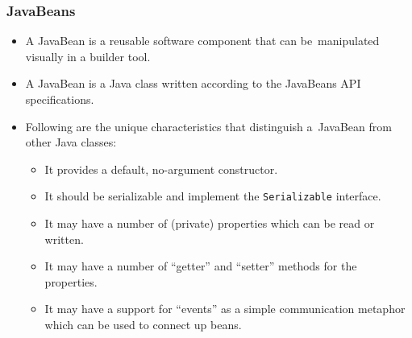 \documentclass[10pt,xcolor=pdflatex]{beamer}
\begin{document}

\begin{frame}[containsverbatim]\frametitle{JavaBeans}
	\begin{itemize}
        \item A JavaBean is a reusable software component that can be~manipulated visually
in a builder tool.
        \item A JavaBean is a Java class written according to the JavaBeans API specifications.
        \item Following are the unique characteristics that distinguish a~JavaBean from other Java classes:
            \begin{itemize}
              \item It provides a default, no-argument constructor.
              \item It should be serializable and implement the \texttt{Serializable} interface.
              \item It may have a number of (private) properties which can be read or written.
              \item It may have a number of ``getter'' and ``setter'' methods for the properties.
              \item It may have a support for ``events'' as a simple communication metaphor which can be used to connect up beans.
            \end{itemize}
    \end{itemize}
\end{frame}
\end{document}
